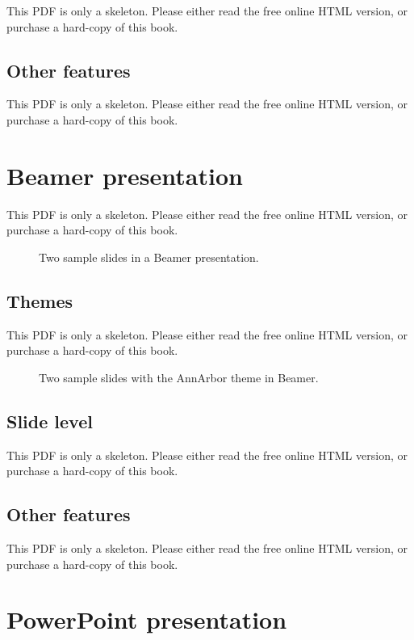 \documentclass[
  11pt,
]{krantz}
\theoremstyle{definition}
\theoremstyle{definition}
\theoremstyle{definition}
\theoremstyle{definition}
\theoremstyle{remark}
\begin{document}
This PDF is only a skeleton. Please either read the free online HTML version, or purchase a hard-copy of this book.

\subsection{Other features}\label{other-features-6}

This PDF is only a skeleton. Please either read the free online HTML version, or purchase a hard-copy of this book.

\section{Beamer presentation}\label{beamer-presentation}

This PDF is only a skeleton. Please either read the free online HTML version, or purchase a hard-copy of this book.

\begin{figure}\caption{Two sample slides in a Beamer presentation.}\end{figure}

\subsection{Themes}\label{themes}

This PDF is only a skeleton. Please either read the free online HTML version, or purchase a hard-copy of this book.

\begin{figure}\caption{Two sample slides with the AnnArbor theme in Beamer.}\end{figure}

\subsection{Slide level}\label{slide-level}

This PDF is only a skeleton. Please either read the free online HTML version, or purchase a hard-copy of this book.

\subsection{Other features}\label{other-features-7}

This PDF is only a skeleton. Please either read the free online HTML version, or purchase a hard-copy of this book.

\section{PowerPoint presentation}\label{powerpoint-presentation}
\end{document}
